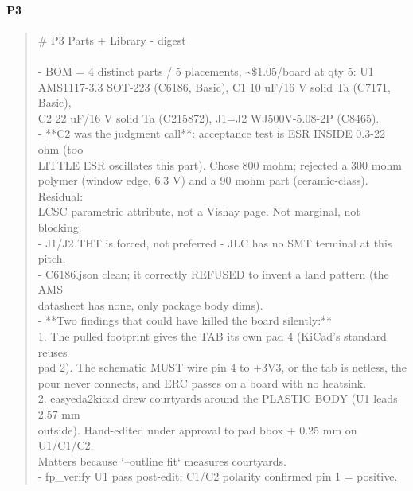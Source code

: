 \documentclass[11pt,a4paper]{article}
\begin{document}
\paragraph*{P3}
\begin{quote}\small\ttfamily\raggedright
\# P3 Parts + Library - digest\\
~\\
- BOM = 4 distinct parts / 5 placements, \textasciitilde{}\$1.05/board at qty 5: U1\\
  AMS1117-3.3 SOT-223 (C6186, Basic), C1 10 uF/16 V solid Ta (C7171, Basic),\\
  C2 22 uF/16 V solid Ta (C215872), J1=J2 WJ500V-5.08-2P (C8465).\\
- {*}{*}C2 was the judgment call{*}{*}: acceptance test is ESR INSIDE 0.3-22 ohm (too\\
  LITTLE ESR oscillates this part). Chose 800 mohm; rejected a 300 mohm\\
  polymer (window edge, 6.3 V) and a 90 mohm part (ceramic-class). Residual:\\
  LCSC parametric attribute, not a Vishay page. Not marginal, not blocking.\\
- J1/J2 THT is forced, not preferred - JLC has no SMT terminal at this pitch.\\
- C6186.json clean; it correctly REFUSED to invent a land pattern (the AMS\\
  datasheet has none, only package body dims).\\
- {*}{*}Two findings that could have killed the board silently:{*}{*}\\
  1. The pulled footprint gives the TAB its own pad 4 (KiCad's standard reuses\\
     pad 2). The schematic MUST wire pin 4 to +3V3, or the tab is netless, the\\
     pour never connects, and ERC passes on a board with no heatsink.\\
  2. easyeda2kicad drew courtyards around the PLASTIC BODY (U1 leads 2.57 mm\\
     outside). Hand-edited under approval to pad bbox + 0.25 mm on U1/C1/C2.\\
     Matters because `--outline fit` measures courtyards.\\
- fp\_verify U1 pass post-edit; C1/C2 polarity confirmed pin 1 = positive.
\end{quote}
\end{document}
